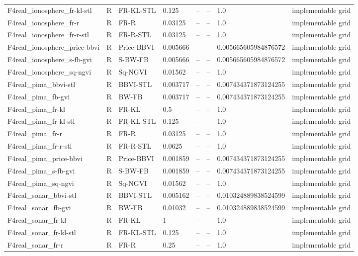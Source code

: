 \begin{tabular}{llllllll}
F4real\_ionosphere\_fr-kl-stl & R & FR-KL-STL & 0.125 & -- & -- & 1.0 & implementable grid \\
F4real\_ionosphere\_fr-r & R & FR-R & 0.03125 & -- & -- & 1.0 & implementable grid \\
F4real\_ionosphere\_fr-r-stl & R & FR-R-STL & 0.03125 & -- & -- & 1.0 & implementable grid \\
F4real\_ionosphere\_price-bbvi & R & Price-BBVI & 0.005666 & -- & -- & 0.005665605984876572 & implementable grid \\
F4real\_ionosphere\_s-fb-gvi & R & S-BW-FB & 0.005666 & -- & -- & 0.005665605984876572 & implementable grid \\
F4real\_ionosphere\_sq-ngvi & R & Sq-NGVI & 0.01562 & -- & -- & 1.0 & implementable grid \\
F4real\_pima\_bbvi-stl & R & BBVI-STL & 0.003717 & -- & -- & 0.007434371873124255 & implementable grid \\
F4real\_pima\_fb-gvi & R & BW-FB & 0.003717 & -- & -- & 0.007434371873124255 & implementable grid \\
F4real\_pima\_fr-kl & R & FR-KL & 0.5 & -- & -- & 1.0 & implementable grid \\
F4real\_pima\_fr-kl-stl & R & FR-KL-STL & 0.125 & -- & -- & 1.0 & implementable grid \\
F4real\_pima\_fr-r & R & FR-R & 0.03125 & -- & -- & 1.0 & implementable grid \\
F4real\_pima\_fr-r-stl & R & FR-R-STL & 0.0625 & -- & -- & 1.0 & implementable grid \\
F4real\_pima\_price-bbvi & R & Price-BBVI & 0.001859 & -- & -- & 0.007434371873124255 & implementable grid \\
F4real\_pima\_s-fb-gvi & R & S-BW-FB & 0.001859 & -- & -- & 0.007434371873124255 & implementable grid \\
F4real\_pima\_sq-ngvi & R & Sq-NGVI & 0.01562 & -- & -- & 1.0 & implementable grid \\
F4real\_sonar\_bbvi-stl & R & BBVI-STL & 0.005162 & -- & -- & 0.010324889838524599 & implementable grid \\
F4real\_sonar\_fb-gvi & R & BW-FB & 0.01032 & -- & -- & 0.010324889838524599 & implementable grid \\
F4real\_sonar\_fr-kl & R & FR-KL & 1 & -- & -- & 1.0 & implementable grid \\
F4real\_sonar\_fr-kl-stl & R & FR-KL-STL & 0.125 & -- & -- & 1.0 & implementable grid \\
F4real\_sonar\_fr-r & R & FR-R & 0.25 & -- & -- & 1.0 & implementable grid \\

\end{tabular}
